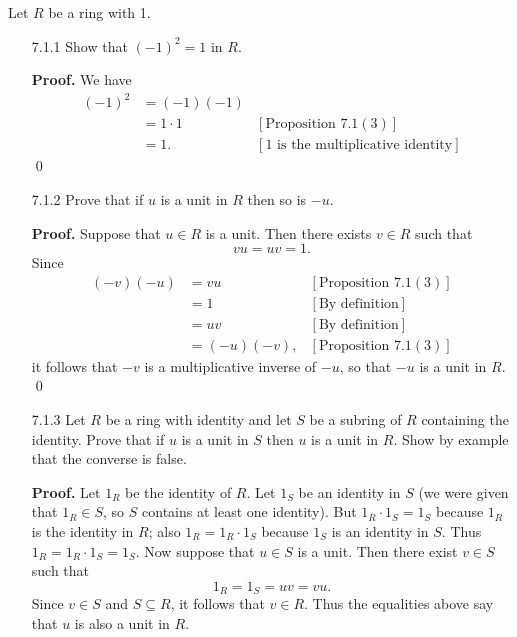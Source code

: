Let $R$ be a ring with 1.
\begin{enumerate}
   \item[7.1.1]   Show that $(-1)^2 = 1$ in $R$.

      \textbf{Proof.} We have
      \begin{align*}
         (-1)^2 &= (-1)(-1) \\
                &= 1 \cdot 1 &[\text{Proposition }7.1 (3)] \\
                &= 1.        &[1 \text{ is the multiplicative identity}]
      \end{align*} \qed
   \item[7.1.2]   Prove that if $u$ is a unit in $R$ then so is $-u$.

      \textbf{Proof.} Suppose that $u \in R$ is a unit. Then there exists
      $v \in R$ such that
      $$vu = uv = 1.$$
      Since
      \begin{align*}
         (-v)(-u) &= vu          &[\text{Proposition }7.1 (3)] \\
                  &= 1           &[\text{By definition}] \\
                  &= uv          &[\text{By definition}] \\
                  &= (-u)(-v),   &[\text{Proposition }7.1 (3)]
      \end{align*}
      it follows that $-v$ is a multiplicative inverse of $-u$, so that $-u$
      is a unit in $R$. \qed
   \item[7.1.3]   Let $R$ be a ring with identity and let $S$ be a subring of
                  $R$ containing the identity. Prove that if $u$ is a unit in
                  $S$ then $u$ is a unit in $R$. Show by example that the
                  converse is false.

      \textbf{Proof.} Let $1_R$ be the identity of $R$. Let $1_S$ be an identity
      in $S$ (we were given that $1_R \in S$, so $S$ contains at least one
      identity). But $1_R \cdot 1_S = 1_S$ because $1_R$ is the identity in
      $R$; also $1_R = 1_R \cdot 1_S$ because $1_S$ is an identity in $S$. Thus
      $1_R = 1_R \cdot 1_S = 1_S$. Now suppose that $u \in S$ is a unit. Then
      there exist $v \in S$ such that
      $$1_R = 1_S = uv = vu.$$
      Since $v \in S$ and $S \subseteq R$, it follows that $v \in R$. Thus the
      equalities above say that $u$ is also a unit in $R$.


\end{enumerate}

